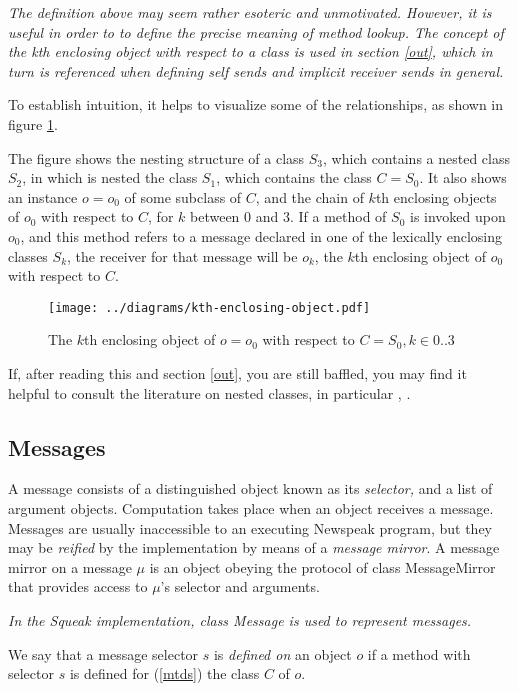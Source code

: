 \documentclass{article}
\newcommand{\code}[1]{{\sf #1}}
\begin{document}
{\it
The definition above may seem  rather esoteric and unmotivated. However, it is useful in order to  to define the precise meaning of method lookup. The concept of the kth enclosing object with respect to a class is used in section \ref{out}, which in turn is referenced when defining self sends and implicit receiver sends in general. 

To establish intuition, it helps to visualize some of the relationships, as shown in figure \ref{kth-enclosing}.

The figure shows the nesting structure of a class $S_3$, which contains a nested class $S_2$, in which is nested the class $S_1$, which contains the class  $C = S_0$.  It also shows an instance $o = o_0$ of some subclass of $C$, and the chain of $k$th enclosing objects of $o_0$ with respect to $C$, for $k$ between 0 and 3. If a method of $S_0$ is invoked upon $o_0$, and this method refers to a message declared in one of the lexically enclosing classes $S_k$, the receiver for that message will be $o_k$, the $k$th enclosing object of $o_0$ with respect to $C$.

\begin{figure}
\texttt{[image: ../diagrams/kth-enclosing-object.pdf]}
\caption{The $k$th enclosing object of $o = o_0$ with respect to $C = S_0, k \in 0 .. 3$}
\label{kth-enclosing}
\end{figure}

If, after reading this and section \ref{out}, you are still baffled, you may  find it helpful to consult the literature on nested classes, in particular \cite{Mads99a} , \cite{innerclasses-ftfjp03}.
}

\subsection{Messages}
\label{msg}

A message consists of a distinguished object known as its  {\em selector,} and a list of argument objects. Computation takes place when an object receives a message. Messages are usually inaccessible to an executing Newspeak program, but they may be {\em reified}  by the
implementation by means of  a {\em message mirror}. A message mirror on a message $\mu$ is an object obeying the protocol of class  \code{MessageMirror} that provides access to $\mu$'s selector and arguments.

{\it 
In the Squeak implementation, class Message is used to represent messages.
}

We say that a message selector $s$ is {\em defined on} an object $o$ if a method with selector $s$ is defined for (\ref{mtds}) the class $C$ of $o$.
\end{document}
